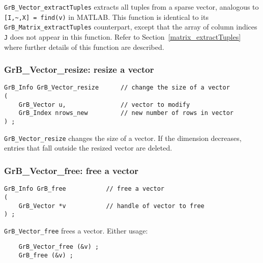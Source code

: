 \documentclass[12pt]{article}
\begin{document}
\verb'GrB_Vector_extractTuples' extracts all tuples from a sparse vector,
analogous to \verb'[I,~,X] = find(v)' in MATLAB.  This function is identical to
its \verb'GrB_Matrix_extractTuples' counterpart, except that the array of
column indices \verb'J' does not appear in this function.  Refer to
Section~\ref{matrix_extractTuples} where further details of this function are
described.

\subsubsection{{\sf GrB\_Vector\_resize:}          resize a vector}
\label{vector_resize}

\begin{mdframed}[userdefinedwidth=6in]
{\footnotesize
\begin{verbatim}
GrB_Info GrB_Vector_resize      // change the size of a vector
(
    GrB_Vector u,               // vector to modify
    GrB_Index nrows_new         // new number of rows in vector
) ;
\end{verbatim} } \end{mdframed}

\verb'GrB_Vector_resize' changes the size of a vector.  If the dimension
decreases, entries that fall outside the resized vector are deleted.

\newpage
\subsubsection{{\sf GrB\_Vector\_free:}          free a vector}
\label{vector_free}

\begin{mdframed}[userdefinedwidth=6in]
{\footnotesize
\begin{verbatim}
GrB_Info GrB_free           // free a vector
(
    GrB_Vector *v           // handle of vector to free
) ;
\end{verbatim}
} \end{mdframed}

\verb'GrB_Vector_free' frees a vector.  Either usage:

    {\small
    \begin{verbatim}
    GrB_Vector_free (&v) ;
    GrB_free (&v) ; \end{verbatim}}
\end{document}

